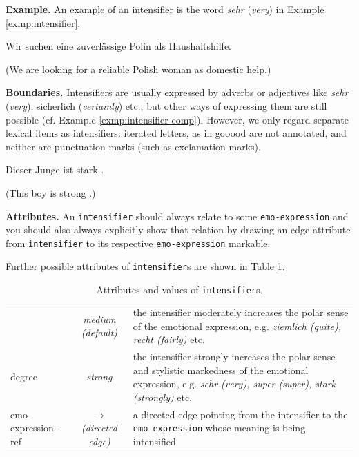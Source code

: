 \noindent\textbf{Example.} An example of an intensifier is the word
\textit{sehr} (\textit{very}) in Example \ref{exmp:intensifier}.
\begin{example}
  Wir suchen eine  zuverl\"assige Polin als
  Haushaltshilfe.

  (We are looking for a  reliable Polish woman as
  domestic help.)\label{exmp:intensifier}
\end{example}
\noindent\textbf{Boundaries.} Intensifiers are usually expressed by
adverbs or adjectives like \textit{sehr} (\textit{very}), sicherlich
(\textit{certainly}) etc., but other ways of expressing them are still
possible (cf. Example \ref{exmp:intensifier-comp}).  However, we only
regard separate lexical items as intensifiers: iterated letters, as in
gooood are not annotated, and neither are punctuation marks (such as
exclamation marks).

\begin{example}
  Dieser Junge ist stark .

  (This boy is strong .)\label{exmp:intensifier-comp}
\end{example}

\noindent\textbf{Attributes.} An \texttt{intensifier} should always
relate to some \texttt{emo-expression} and you should also always
explicitly show that relation by drawing an edge attribute from
\texttt{intensifier} to its respective \texttt{emo-expression}
markable.

Further possible attributes of \texttt{intensifier}s are shown in
Table \ref{tbl:intensifier}.
\begin{center}
  \begin{table}[htb]
    \caption{Attributes and values of \texttt{intensifier}s.}
    \begin{tabular}{|l|c|p{0.875\clmnwidth}|}\hline

      & \textit{medium (default)} & the intensifier moderately
      increases the polar sense of the emotional expression,
      e.g. \textit{ziemlich (quite), recht (fairly)} etc.\\\cline{2-3}

      \multirow{-2}{*}{degree} & \textit{strong} & the intensifier
      strongly increases the polar sense and stylistic markedness of the
      emotional expression, e.g. \textit{sehr (very), super (super),
        stark (strongly)} etc.\\\hline


      emo-expression-ref & \textit{$\longrightarrow$\newline(directed
        edge)} & a directed edge pointing from the intensifier to the
      \texttt{emo-expression} whose meaning is being intensified\\\hline
    \end{tabular}
    \label{tbl:intensifier}
  \end{table}
\end{center}


